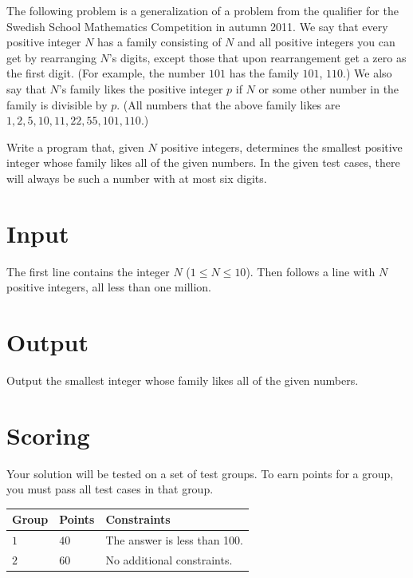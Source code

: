 The following problem is a generalization of a problem from the qualifier for the Swedish School Mathematics Competition in autumn 2011. We say that every positive integer $N$ has a family consisting of $N$ and all positive integers you can get by rearranging $N$'s digits, except those that upon rearrangement get a zero as the first digit. (For example, the number $101$ has the family $101$, $110$.) We also say that $N$'s family likes the positive integer $p$ if $N$ or some other number in the family is divisible by $p$. (All numbers that the above family likes are $1,2,5,10,11,22,55,101,110$.)

Write a program that, given $N$ positive integers, determines the smallest positive integer whose family likes all of the given numbers. In the given test cases, there will always be such a number with at most six digits.
\section*{Input}
The first line contains the integer $N$ ($1\leq N \leq 10$). Then follows a line with $N$ positive integers, all less than one million.

\section*{Output}
Output the smallest integer whose family likes all of the given numbers.

\section*{Scoring}
Your solution will be tested on a set of test groups.
To earn points for a group, you must pass all test cases in that group.

\noindent
\begin{tabular}{| l | l | p{12cm} |}
  \hline
  \textbf{Group} & \textbf{Points} & \textbf{Constraints} \\ \hline
  $1$    & $40$          & The answer is less than 100.  \\ \hline
  $2$    & $60$          & No additional constraints.  \\ \hline
\end{tabular}
